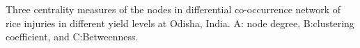 Three centrality measures of the nodes in differential co-occurrence network of rice injuries in different yield levels at Odisha, India. A: node degree, B:clustering coefficient, and C:Betweenness.
\label{fig:nodepropdifyieldTM}
